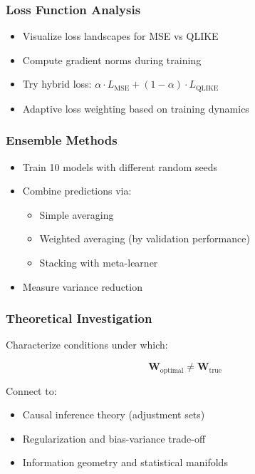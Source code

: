 \documentclass[10pt,a4paper]{article}
\newcommand{\bW}{\boldsymbol{W}}
\begin{document}
\subsubsection{Loss Function Analysis}

\begin{itemize}
\item Visualize loss landscapes for MSE vs QLIKE
\item Compute gradient norms during training
\item Try hybrid loss: $\alpha \cdot L_{\text{MSE}} + (1-\alpha) \cdot L_{\text{QLIKE}}$
\item Adaptive loss weighting based on training dynamics
\end{itemize}

\subsubsection{Ensemble Methods}

\begin{itemize}
\item Train 10 models with different random seeds
\item Combine predictions via:
\begin{itemize}
\item Simple averaging
\item Weighted averaging (by validation performance)
\item Stacking with meta-learner
\end{itemize}
\item Measure variance reduction
\end{itemize}

\subsubsection{Theoretical Investigation}

Characterize conditions under which:

\begin{equation}
\bW_{\text{optimal}} \neq \bW_{\text{true}}
\end{equation}

Connect to:
\begin{itemize}
\item Causal inference theory (adjustment sets)
\item Regularization and bias-variance trade-off
\item Information geometry and statistical manifolds
\end{itemize}
\end{document}

